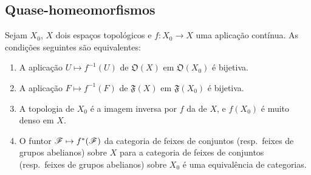 \subsection{Quase-homeomorfismos}
\label{subsection:IV.10.2}

\begin{proposition}[10.2.1]
\label{IV.10.2.1}
Sejam $X_0$, $X$ dois espaços topológicos e $f:X_0\to X$ uma aplicação contínua.
As condições seguintes são equivalentes:
\begin{enumerate}[label=\emph{\alph*)}]
  \item A aplicação $U\mapsto f^{-1}(U)$ de $\mathfrak{O}(X)$ em $\mathfrak{O}(X_0)$ é bijetiva.
  \item[\rm a$'$)] A aplicação $F\mapsto f^{-1}(F)$ de $\mathfrak{F}(X)$ em $\mathfrak{F}(X_0)$ é bijetiva.
  \item A topologia de $X_0$ é a imagem inversa por $f$ da de $X$, e $f(X_0)$ é muito denso  em $X$.
  \item O funtor $\sh{F}\mapsto f^*(\sh{F})$ da categoria de feixes de conjuntos (resp.\ feixes de grupos abelianos) sobre $X$ para a categoria de feixes de conjuntos (resp.\ feixes de grupos abelianos) sobre $X_0$ é uma equivalência de categorias.
\end{enumerate}
\end{proposition}

